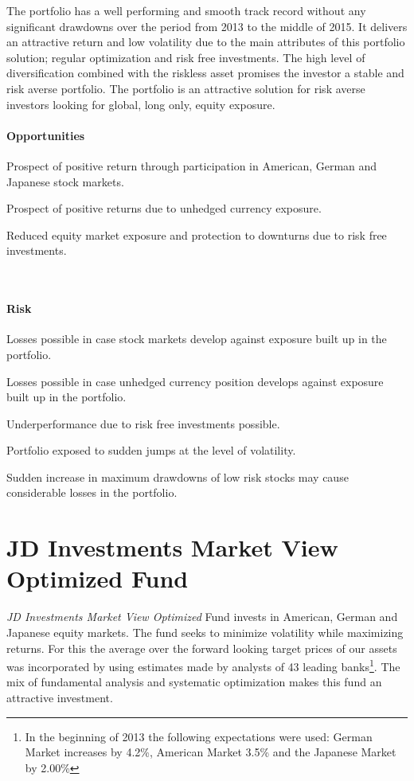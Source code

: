 \documentclass[11pt, parskip=full, DIV=14]{scrreprt}
\begin{document}
The portfolio has a well performing and smooth track record without any significant drawdowns over the period from 2013 to the middle of 2015.
It delivers an attractive return and low volatility due to the main attributes of this portfolio solution; regular optimization and risk free investments.
The high level of diversification combined with the riskless asset promises the investor a stable and risk averse portfolio.
The portfolio is an attractive solution for risk averse investors looking for global, long only, equity exposure.
 

\begin{minipage}[t]{0.49\textwidth}
  \paragraph{Opportunities}
  \begin{sit}
    \item Prospect of positive return through participation in American, German and Japanese stock markets.
    \item Prospect of positive returns due to unhedged currency exposure.
    \item Reduced equity market exposure and protection to downturns due to risk free investments.
  \end{sit}
\end{minipage}
~~
\begin{minipage}[t]{0.49\textwidth}
  \paragraph{Risk}
  \begin{sit}
    \item Losses possible in case stock markets develop against exposure built up in the portfolio.
    \item Losses possible in case unhedged currency position develops against exposure built up in the portfolio.
    \item Underperformance due to risk free investments possible.
    \item Portfolio exposed to sudden jumps at the level of volatility.
    \item Sudden increase in maximum drawdowns of low risk stocks may cause considerable losses in the portfolio.
  \end{sit}
\end{minipage}

\newpage\section*{JD Investments Market View Optimized Fund}
\textit{JD Investments Market View Optimized} Fund invests in American, German and Japanese equity markets.
The fund seeks to minimize volatility while maximizing returns.
For this the average over the forward looking target prices of our assets was incorporated by using estimates made by analysts of 43 leading banks\footnote{In the beginning of 2013 the following expectations were used: German Market increases by 4.2\%, American Market 3.5\% and the Japanese Market by 2.00\%}.
The mix of fundamental analysis and systematic optimization makes this fund an attractive investment.
\end{document}
